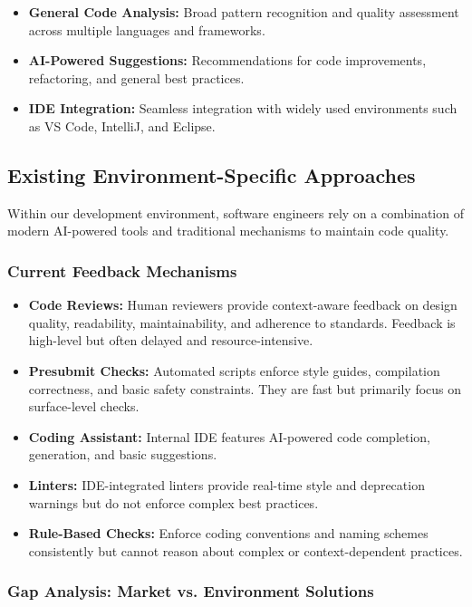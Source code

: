 \begin{spacing}{1.2}
\begin{itemize}
\item \textbf{General Code Analysis:} Broad pattern recognition and quality assessment across multiple languages and frameworks.
\item \textbf{AI-Powered Suggestions:} Recommendations for code improvements, refactoring, and general best practices.
\item \textbf{IDE Integration:} Seamless integration with widely used environments such as VS Code, IntelliJ, and Eclipse.
\end{itemize}

\subsection{Existing Environment-Specific Approaches}

Within our development environment, software engineers rely on a combination of modern AI-powered tools and traditional mechanisms to maintain code quality.

\subsubsection{Current Feedback Mechanisms}

\begin{itemize}
\item \textbf{Code Reviews:} Human reviewers provide context-aware feedback on design quality, readability, maintainability, and adherence to standards. Feedback is high-level but often delayed and resource-intensive.
\item \textbf{Presubmit Checks:} Automated scripts enforce style guides, compilation correctness, and basic safety constraints. They are fast but primarily focus on surface-level checks.
\item \textbf{Coding Assistant:} Internal IDE features AI-powered code completion, generation, and basic suggestions.
\item \textbf{Linters:} IDE-integrated linters provide real-time style and deprecation warnings but do not enforce complex best practices.
\item \textbf{Rule-Based Checks:} Enforce coding conventions and naming schemes consistently but cannot reason about complex or context-dependent practices.
\end{itemize}

\subsubsection{Gap Analysis: Market vs. Environment Solutions}


\end{spacing}
